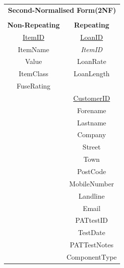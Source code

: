 \newpage

\begin{center}
    \begin{tabular}{|c|c|}
        \hline
        \multicolumn{2}{|c|}{\textbf{Second-Normalised Form(2NF)}} \\
        \multicolumn{2}{|c|}{ }                                    \\ \hline
        \textbf{Non-Repeating} & \textbf{Repeating}                \\ \hline
        \underline{ItemID}     & \underline{LoanID}                \\ 
        ItemName               & \emph{ItemID}                     \\ 
        Value	              & LoanRate                          \\ 
        ItemClass	          & LoanLength                        \\ 
        FuseRating             & 					                \\
                               &\underline{CustomerID}             \\ 
                               & Forename                          \\ 
              	              & Lastname                          \\ 
                               & Company                           \\ 
                               & Street                            \\ 
                               & Town                              \\ 
                               & PostCode                          \\ 
                               & MobileNumber                      \\ 
                               & Landline                          \\ 
                               & Email                             \\ 
                               & PATtestID                         \\ 
                               & TestDate                          \\ 
                               & PATTestNotes                      \\ 
                               & ComponentType                     \\

\end{tabular}
\end{center}
